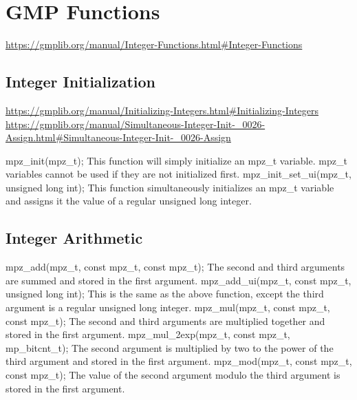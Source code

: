 \section{GMP Functions}


\url{https://gmplib.org/manual/Integer-Functions.html#Integer-Functions}


\subsection{Integer Initialization}

\url{https://gmplib.org/manual/Initializing-Integers.html#Initializing-Integers}
\url{https://gmplib.org/manual/Simultaneous-Integer-Init-_0026-Assign.html#Simultaneous-Integer-Init-_0026-Assign}

mpz\_init(mpz\_t);\break
This function will simply initialize an mpz\_t variable.
mpz\_t variables cannot be used if they are not initialized
first.
\medskip
mpz\_init\_set\_ui(mpz\_t, unsigned long int);\break
This function simultaneously initializes an mpz\_t variable
and assigns it the value of a regular unsigned long integer.


\subsection{Integer Arithmetic}

mpz\_add(mpz\_t, const mpz\_t, const mpz\_t);\break
The second and third arguments are summed and stored in the
first argument.
\medskip
mpz\_add\_ui(mpz\_t, const mpz\_t, unsigned long int);\break
This is the same as the above function, except the third
argument is a regular unsigned long integer.
\medskip
mpz\_mul(mpz\_t, const mpz\_t, const mpz\_t);\break
The second and third arguments are multiplied together and
stored in the first argument.
\medskip
mpz\_mul\_2exp(mpz\_t, const mpz\_t, mp\_bitcnt\_t);\break
The second argument is multiplied by two to the power of
the third argument and stored in the first argument.
\medskip
mpz\_mod(mpz\_t, const mpz\_t, const mpz\_t);
The value of the second argument modulo the third argument
is stored in the first argument.

